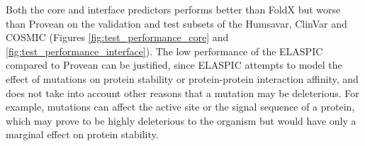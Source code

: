 Both the core and interface predictors performs better than FoldX but worse than Provean on the validation and test subsets of the Humsavar, ClinVar and COSMIC (Figures \ref{fig:test_performance_core} and \ref{fig:test_performance_interface}). The low performance of the ELASPIC compared to Provean can be justified, since ELASPIC attempts to model the effect of mutations on protein stability or protein-protein interaction affinity, and does not take into account other reasons that a mutation may be deleterious. For example, mutations can affect the active site or the signal sequence of a protein, which may prove to be highly deleterious to the organism but would have only a marginal effect on protein stability.

\clearpage

